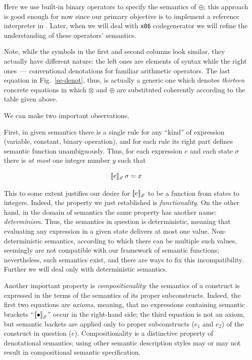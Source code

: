 Here we use built-in \lama binary operators to specify the semantics of $\oplus$; this approach is good enough for now since our primary objective is
to implement a reference interpreter in \lama. Later, when we will deal with \texttt{x86} codegenerator we will refine the understanding of
these operators' semantics.

Note, while the symbols in the first and second columns look similar, they actually have different nature: the left ones are
elements of syntax while the right ones~--- conventional denotations for familiar arithmetic operators.
The last equation in Fig.~\ref{se-denot}, thus, is actually a generic one which denotes \emph{thirteen} concrete equations in which $\otimes$ and $\oplus$ are
substituted coherently according to the table given above.

We can make two important observations.

First, in given semantics there is a single rule for any ``kind'' of expression (variable, constant, binary operation), and for each rule its right part defines
semantic function unambiguously. Thus, for each expression $e$ and each state $\sigma$ there is \emph{at most} one
integer number $y$ such that

\[
  \sembr{e}^\ph_\mathscr{E}\,\sigma=x
\]

This to some extent justifies our desire for $\sembr{e}^\ph_\mathscr{E}$ to be a function from states to integers. Indeed, the
property we just established is \emph{functionality}. On the other hand, in the domain of semantics the same property has
another name: \emph{determinism}. Thus, the semantics in question is deterministic, meaning that evaluating any expression in a given state
delivers at most one value. Non-deterministic semantics, according to which there can be multiple such values, seemingly are not
compatible with our framework of semantic functions; nevertheless, such semantics exist, and there are ways to fix this incompatibility.
Further we will deal only with deterministic semantics. 

Another important property is \emph{compositionality}: the semantics of a construct is expressed in the terms of the semantics
of its proper subconstructs. Indeed, the first two equations are \emph{axioms}, meaning, that no expressions containing semantic
brackets ``$\sembr{\bullet}^\ph_\mathscr{E}$'' occur in the right-hand side; the third equation is not an axiom, but semantic
backets are applied only to proper subconstructs ($e_1$ and $e_2$) of the construct in question ($e$). Compositionality is
a distinctive property of denotational semantics; using other semantic description styles may or may not result in compositional
semantic specification.

